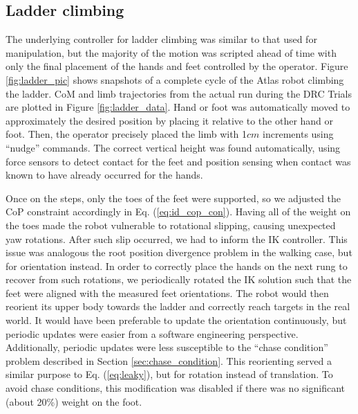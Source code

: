 \documentclass{ws-ijhr}
\newcommand{\eref}[1] {Eq. (\ref{#1})}
\newcommand{\fref}[1] {Figure \ref{#1}}
\newcommand{\sref}[1] {Section \ref{#1}}
\begin{document}
\subsection{Ladder climbing}
The underlying controller for ladder climbing was similar to that used for 
manipulation, but the majority of the motion was scripted ahead of time with 
only the final placement of the hands and feet controlled by the operator. 
\fref{fig:ladder_pic} shows snapshots of a complete cycle of the Atlas robot
climbing the ladder. 
CoM and limb trajectories from the actual run during the DRC Trials are 
plotted in \fref{fig:ladder_data}. 
Hand or foot was automatically moved to approximately the desired position by 
placing it relative to the other hand or foot. 
Then, the operator precisely placed the limb with 1$cm$ increments using 
``nudge'' commands. 
The correct vertical height was found automatically, using force sensors to 
detect contact for the feet and position sensing when contact was
known to have already occurred for the hands.

Once on the steps, only the toes of the feet were supported, so we adjusted
the CoP constraint accordingly in \eref{eq:id_cop_con}. 
Having all of the weight on the toes made the robot vulnerable to rotational
slipping, causing unexpected yaw rotations.
After such slip occurred, we had to inform the IK controller. 
This issue was analogous the root position divergence problem in the walking
case, but for orientation instead.
In order to correctly place the hands on the next rung to recover from such 
rotations, we periodically rotated the IK solution such that the feet were
aligned with the measured feet orientations. 
The robot would then reorient its upper body towards the ladder and correctly 
reach targets in the real world.  
It would have been preferable to update the orientation continuously, but 
periodic updates were easier from a software engineering perspective.  
Additionally, periodic updates were less susceptible to the ``chase condition''
problem described in \sref{sec:chase_condition}. 
This reorienting served a similar purpose to \eref{eq:leaky}, but for 
rotation instead of translation. 
To avoid chase conditions, this modification was disabled if there was no 
significant (about 20\%) weight on the foot.
\end{document}
